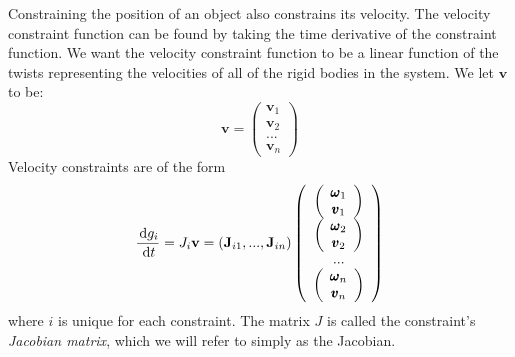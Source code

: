         Constraining the position of an object also constrains its velocity. The velocity constraint function can be found by taking the time derivative of the constraint function. We want the velocity constraint function to be a linear function of the twists representing the velocities of all of the rigid bodies in the system. We let $\mathbf{v}$ to be:
        \begin{equation}
            \mathbf{v} = \left( \begin{array}{c}\mathbf{v}_1 \\\mathbf{v}_2 \\ ... \\ \mathbf{v}_n \end{array}\right)
        \end{equation}
        Velocity constraints are of the form
        \begin{equation}
            \frac{\,\mathrm{d} g_i}{\,\mathrm{d} t} = J_i \mathbf{v} = (\mathbf{J}_{i1} ,...,\mathbf{J}_{in} )\left(\begin{array}{c}\left(\begin{array}{c}\pmb{\omega}_1 \\ \pmb{v}_1\end{array}\right) \\ \left(\begin{array}{c}\pmb{\omega}_2 \\ \pmb{v}_2\end{array}\right) \\ ... \\ \left(\begin{array}{c}\pmb{\omega}_n \\ \pmb{v}_n\end{array}\right)\end{array}\right)
        \end{equation}
        where $i$ is unique for each constraint. The matrix $J$ is called the constraint's \textit{Jacobian matrix}, which we will refer to simply as the Jacobian. \\

